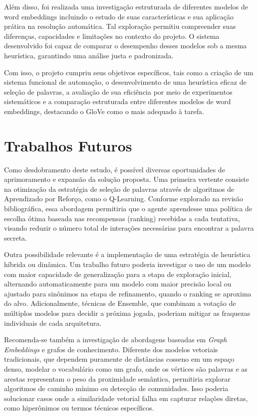 Além disso, foi realizada uma investigação estruturada de diferentes modelos de word embeddings incluindo o estudo de suas características e sua aplicação prática na resolução automática. Tal exploração permitiu compreender suas diferenças, capacidades e limitações no contexto do projeto. O sistema desenvolvido foi capaz de comparar o desempenho desses modelos sob a mesma heurística, garantindo uma análise justa e padronizada.

Com isso, o projeto cumpriu seus objetivos específicos, tais como a criação de um sistema funcional de automação, o desenvolvimento de uma heurística eficaz de seleção de palavras, a avaliação de sua eficiência por meio de experimentos sistemáticos e a comparação estruturada entre diferentes modelos de word embeddings, destacando o GloVe como o mais adequado à tarefa.

\section{Trabalhos Futuros}

Como desdobramento deste estudo, é possível diversas oportunidades de aprimoramento e expansão da solução proposta. Uma primeira vertente consiste na otimização da estratégia de seleção de palavras através de algoritmos de Aprendizado por Reforço, como o Q-Learning. Conforme explorado na revisão bibliográfica, essa abordagem permitiria que o agente aprendesse uma política de escolha ótima baseada nas recompensas (ranking) recebidas a cada tentativa, visando reduzir o número total de interações necessárias para encontrar a palavra secreta.

Outra possibilidade relevante é a implementação de uma estratégia de heurística híbrida ou dinâmica. Um trabalho futuro poderia investigar o uso de um modelo com maior capacidade de generalização para a etapa de exploração inicial, alternando automaticamente para um modelo com maior precisão local ou ajustado para sinônimos na etapa de refinamento, quando o ranking se aproxima do alvo. Adicionalmente, técnicas de Ensemble, que combinam a votação de múltiplos modelos para decidir a próxima jogada, poderiam mitigar as fraquezas individuais de cada arquitetura.

Recomenda-se também a investigação de abordagens baseadas em \textit{Graph Embeddings} e grafos de conhecimento. Diferente dos modelos vetoriais tradicionais, que dependem puramente de distâncias cosseno em um espaço denso, modelar o vocabulário como um grafo, onde os vértices são palavras e as arestas representam o peso da proximidade semântica, permitiria explorar algoritmos de caminho mínimo ou detecção de comunidades. Isso poderia solucionar casos onde a similaridade vetorial falha em capturar relações diretas, como hiperônimos ou termos técnicos específicos.

